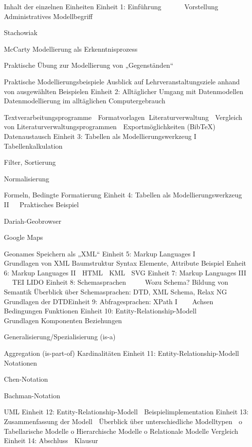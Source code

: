 Inhalt der einzelnen Einheiten
Einheit 1: Einführung





Vorstellung
Administratives
Modellbegriff
\item Stachowiak
\item McCarty
Modellierung als Erkenntnisprozess
\item Praktische Übung zur Modellierung von „Gegenständen“
\item Praktische Modellierungsbeispiele
Ausblick auf Lehrveranstaltungsziele anhand von ausgewählten Beispielen
Einheit 2: Alltäglicher Umgang mit Datenmodellen

Datenmodellierung im alltäglichen Computergebrauch
\item Textverarbeitungsprogramme

Formatvorlagen
Literaturverwaltung

Vergleich von Literaturverwaltungsprogrammen

Exportmöglichkeiten (BibTeX)

Datenaustausch
Einheit 3: Tabellen als Modellierungswerkzeug I

Tabellenkalkulation
\item Filter, Sortierung
\item Normalisierung
\item Formeln, Bedingte Formatierung
Einheit 4: Tabellen als Modellierungswerkzeug II


Praktisches Beispiel
\item Dariah-Geobrowser
\item Google Maps
\item Geonames
Speichern als „XML“
Einheit 5: Markup Languages I





Grundlagen von XML
Baumstruktur
Syntax
Elemente, Attribute
Beispiel
Enheit 6: Markup Languages II
 HTML
 KML
 SVG
Einheit 7: Markup Languages III


TEI
LIDO
Einheit 8: Schemasprachen




Wozu Schema?
Bildung von Semantik
Überblick über Schemasprachen: DTD, XML Schema, Relax NG
Grundlagen der DTDEinheit 9: Abfragesprachen: XPath I



Achsen
Bedingungen
Funktionen
Einheit 10: Entity-Relationship-Modell




Grundlagen
Komponenten
Beziehungen
\item Generalisierung/Spezialisierung (is-a)
\item Aggregation (is-part-of)
Kardinalitäten
Einheit 11: Entity-Relationship-Modell

Notationen
\item Chen-Notation
\item Bachman-Notation
\item UML
Einheit 12: Entity-Relationship-Modell

Beispielimplementation
Einheit 13: Zusammenfassung der Modell
 Überblick über unterschiedliche Modelltypen

o Tabellarische Modelle
o Hierarchische Modelle
o Relationale Modelle
Vergleich
Einheit 14: Abschluss
 Klausur











